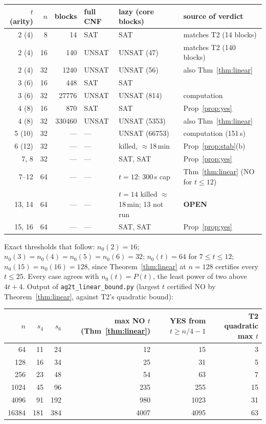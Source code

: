 \documentclass[11pt]{article}
\theoremstyle{definition}
\theoremstyle{remark}
\begin{document}
\begin{center}
\begin{tabular}{rrrlll}
\toprule
$t$ (arity) & $n$ & blocks & full CNF & lazy (core blocks) & source of verdict\\
\midrule
2 (4) & 8 & 14 & SAT & SAT & matches T2 (14 blocks)\\
2 (4) & 16 & 140 & UNSAT & UNSAT (47) & matches T2 (140 blocks)\\
2 (4) & 32 & 1240 & UNSAT & UNSAT (56) & also Thm~\ref{thm:linear}\\
3 (6) & 16 & 448 & SAT & SAT & \\
3 (6) & 32 & 27776 & UNSAT & UNSAT (814) & computation\\
4 (8) & 16 & 870 & SAT & SAT & Prop~\ref{prop:yes}\\
4 (8) & 32 & 330460 & UNSAT & UNSAT (5353) & also Thm~\ref{thm:linear}\\
5 (10) & 32 & --- & --- & UNSAT (66753) & computation (151\,s)\\
6 (12) & 32 & --- & --- & killed, $\approx$18\,min & Prop~\ref{prop:stab}(b)\\
7, 8 & 32 & --- & --- & SAT, SAT & Prop~\ref{prop:yes}\\
7--12 & 64 & --- & --- & $t{=}12$: 300\,s cap & Thm~\ref{thm:linear} (NO for $t\le12$)\\
13, 14 & 64 & --- & --- & $t{=}14$ killed $\approx$18\,min; 13 not run & \textbf{OPEN}\\
15, 16 & 64 & --- & --- & SAT, SAT & Prop~\ref{prop:yes}\\
\bottomrule
\end{tabular}
\end{center}
Exact thresholds that follow: $n_0(2)=16$; $n_0(3)=n_0(4)=n_0(5)=n_0(6)=32$;
$n_0(t)=64$ for $7\le t\le12$; $n_0(15)=n_0(16)=128$, since Theorem~\ref{thm:linear} at
$n=128$ certifies every $t\le25$. Every case agrees with $n_0(t)=P(t)$, the least power of two
above $4t+4$. Output of \texttt{ag2t\_linear\_bound.py} (largest $t$ certified NO by
Theorem~\ref{thm:linear}, against T2's quadratic bound):
\begin{center}
\begin{tabular}{rrrrrr}
\toprule
$n$ & $s_4$ & $s_6$ & max NO $t$ (Thm~\ref{thm:linear}) & YES from $t\ge n/4-1$ & T2 quadratic max $t$\\
\midrule
64 & 11 & 24 & 12 & 15 & 3\\
128 & 16 & 34 & 25 & 31 & 5\\
256 & 23 & 48 & 54 & 63 & 7\\
1024 & 45 & 96 & 235 & 255 & 15\\
4096 & 91 & 192 & 980 & 1023 & 31\\
16384 & 181 & 384 & 4007 & 4095 & 63\\
\bottomrule
\end{tabular}
\end{center}
\end{document}
